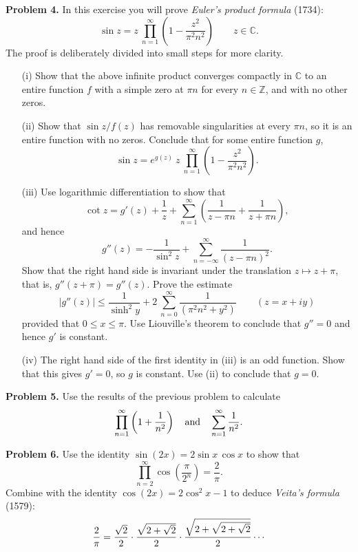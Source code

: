 \documentclass[12pt]{amsart}
\newcommand{\CC}{{\mathbb C}}
\newcommand{\ZZ}{{\mathbb Z}}
\newcommand{\vs}{\vspace{2mm}}
\begin{document}
\noindent
{\bf Problem 4.} In this exercise you will prove {\it Euler's product formula} (1734):
$$
\sin z = z \ \prod_{n=1}^{\infty} \left( 1-\frac{z^2}{\pi^2 n^2} \right) \qquad z \in \CC.
$$
The proof is deliberately divided into small steps for more clarity. \vs
\begin{enumerate}
\item[(i)]
Show that the above infinite product converges compactly in $\CC$ to an entire function $f$ with a simple zero at $\pi n$ for every $n \in \ZZ$, and with no other zeros. \vs
\item[(ii)]
Show that $\sin z / f(z)$ has removable singularities at every $\pi n$, so it is an entire function with no zeros. Conclude that for some entire function $g$,
$$
\sin z = e^{g(z)}\ z\ \prod_{n=1}^{\infty} \left( 1-\frac{z^2}{\pi^2 n^2} \right).
$$
\item[(iii)]
Use logarithmic differentiation to show that
$$
\cot z = g'(z)+\frac{1}{z}+\sum_{n=1}^{\infty} \left( \frac{1}{z-\pi n}+ \frac{1}{z+\pi n} \right),
$$
and hence
$$
g''(z)=- \frac{1}{\sin^2 z}+\sum_{n=-\infty}^{\infty} \frac{1} {(z-\pi n)^2}.
$$
Show that the right hand side is invariant under the translation $z \mapsto z+\pi$, that is, $g''(z+\pi)=g''(z)$. Prove the estimate
$$
|g''(z)| \leq \frac{1}{\sinh^2 y} + 2 \ \sum_{n=0}^{\infty} \frac{1}{(\pi^2 n^2+y^2)} \qquad (z=x+iy)
$$
provided that $0 \leq x \leq \pi$. Use Liouville's theorem to conclude that $g''=0$ and hence $g'$ is constant. \vs
\item[(iv)]
The right hand side of the first identity in (iii) is an odd function. Show that this gives $g' = 0$, so $g$ is constant. Use
(ii) to conclude that $g = 0$. \vs
\end{enumerate}

\noindent
{\bf Problem 5.} Use the results of the previous problem to calculate 
$$
\prod_{n=1}^{\infty} \left( 1+\frac{1}{n^2} \right) \quad \text{and} \quad \sum_{n=1}^{\infty} \frac{1}{n^2}. \vs
$$

\noindent
{\bf Problem 6.} Use the identity $\sin (2x) = 2 \sin x \, \cos x$ to show that
$$
\prod_{n=2}^{\infty} \cos \left( \frac{\pi}{2^n} \right) = \frac{2}{\pi}.
$$
Combine with the identity $\cos(2x)=2\cos^2 x -1$ to deduce {\it Veita's formula} (1579):
$$
\frac{2}{\pi} = \frac{\sqrt 2}{2} \cdot \frac{\sqrt{2+\sqrt{2}}}{2} \cdot \frac{\sqrt{2+\sqrt{2+\sqrt{2}}}}{2} \cdots \vs
$$
\end{document}
